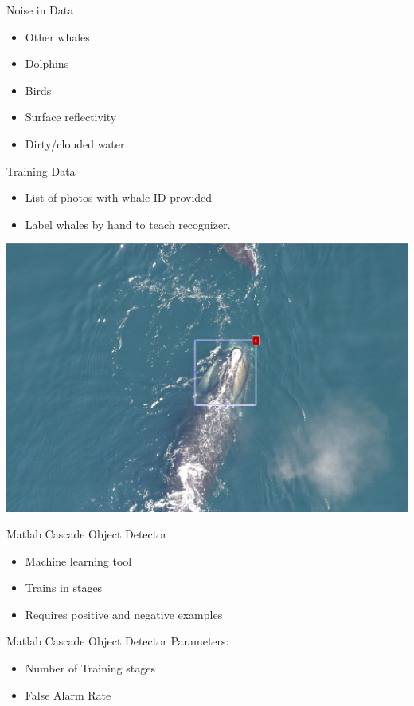 \documentclass{beamer}
\begin{document}
\begin{frame}{Noise in Data}
\begin{itemize}
\item Other whales
\item Dolphins
\item Birds
\item Surface reflectivity
\item Dirty/clouded water
\end{itemize}
\end{frame}

\begin{frame}{Training Data}
\begin{itemize}
\item List of photos with whale ID provided
\item Label whales by hand to teach recognizer.
\end{itemize}
\includegraphics[scale=.25]{label.png}
\end{frame}

\begin{frame}{Matlab Cascade Object Detector}
\begin{itemize}
\item Machine learning tool
\item Trains in stages
\item Requires positive and negative examples
\end{itemize}
\end{frame}

\begin{frame}{Matlab Cascade Object Detector}
Parameters:
\begin{itemize}
\item Number of Training stages
\item False Alarm Rate
\end{itemize}
\end{frame}
\end{document}
